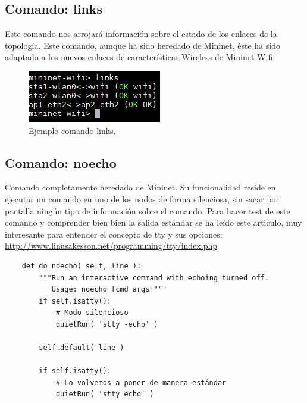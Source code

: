 \subsection{Comando: links}
Este comando nos arrojará información sobre el estado de los enlaces de la topología. Este comando, aunque ha sido heredado de Mininet, éste ha sido adaptado a los nuevos enlaces de características Wireless de Mininet-Wifi. \newline
\newline
 \begin{figure}[!htb]
  \centering
    \includegraphics[width=0.4\linewidth]{./img/cli/7.JPG}
    \caption{Ejemplo comando links.}
  \label{fig:yo}
\end{figure}
\subsection{Comando: noecho}
Comando completamente heredado de Mininet. Su funcionalidad reside en ejecutar un comando en uno de los nodos de forma silenciosa, sin sacar por pantalla ningún tipo de información sobre el comando. Para hacer test de este comando y comprender bien bien la salida estándar se ha leído este articulo, muy interesante para entender el concepto de tty y sus opciones: \url{http://www.linusakesson.net/programming/tty/index.php} \newline
\begin{verbatim}
    def do_noecho( self, line ):
        """Run an interactive command with echoing turned off.
           Usage: noecho [cmd args]"""
        if self.isatty():
            # Modo silencioso
            quietRun( 'stty -echo' )
            
        self.default( line )
        
        if self.isatty():
            # Lo volvemos a poner de manera estándar
            quietRun( 'stty echo' )
\end{verbatim}
